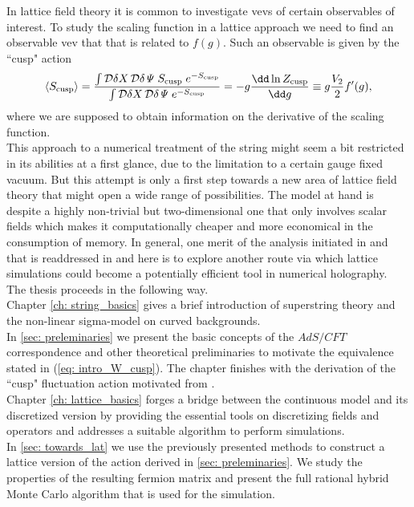 %
%
In lattice field theory it is common to investigate vevs of certain observables of interest. To study the scaling function in a lattice approach we need to find an observable vev that that is related to $f(g)$. Such an observable is given by the ``cusp" action
%
%
\begin{equation}
\langle S_{\rm cusp} \rangle = \frac{\int \mathcal{D}\delta X\,\mathcal{D}\delta\mathit{\Psi} \; S_{\rm cusp} \;e^{-S_{\rm cusp}}}{\int \mathcal{D}\delta X\,\mathcal{D}\delta\mathit{\Psi} \; e^{-S_{\rm cusp}}} = -g \frac{\dd \ln Z_{\rm cusp}}{\dd g} \equiv g\frac{V_{2}}{2} f'(g),
\end{equation}
%
%
where we are supposed to obtain information on the derivative of the scaling function.\\
This approach to a numerical treatment of the  string might seem a bit restricted in its abilities at a first glance, due to the limitation to a certain gauge fixed vacuum. But this attempt is only a first step towards a new area of lattice field theory that might open a wide range of possibilities. The model at hand is despite a highly non-trivial but two-dimensional one that only involves scalar fields which makes it computationally cheaper and more economical in the consumption of memory. In general, one merit of the analysis initiated in \cite{Roiban} and that is readdressed in \cite{Bianchi:2016cyv,Forini:2016sot} and here is to explore another route via which lattice simulations could become a potentially efficient tool in numerical holography.\\[0.5cm]
%
%
The thesis proceeds in the following way.\\
%
Chapter \ref{ch: string_basics} gives a brief introduction of superstring theory and the non-linear sigma-model on curved backgrounds.\\
%
In \autoref{sec: preleminaries} we present the basic concepts of the $AdS/CFT$ correspondence and other theoretical preliminaries to motivate the equivalence stated in (\ref{eq: intro_W_cusp}). The chapter finishes with the derivation of the ``cusp" fluctuation action motivated from \cite{Metsaev:2000yu,Metsaev:2000yf,Giombi:2009gd}.\\
%
Chapter \ref{ch: lattice_basics} forges a bridge between the continuous model and its discretized version by providing the essential tools on discretizing fields and operators and addresses a suitable algorithm to perform simulations.\\
%
In \autoref{sec: towards_lat} we use the previously presented methods to construct a lattice version of the action derived in \autoref{sec: preleminaries}. We study the properties of the resulting fermion matrix and present the full rational hybrid Monte Carlo algorithm that is used for the simulation.\\
